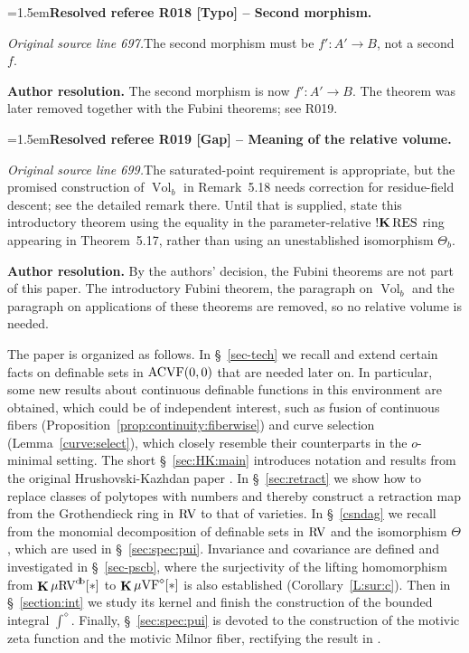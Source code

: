 \documentclass[12pt]{amsart}
\newcommand{\ResolvedRefereeRemark}[5]{%
  \par\medskip\begingroup\normalfont\small\color{gray}%
  \emergencystretch=1.5em\noindent\textbf{Resolved referee R#1 [#2] -- #3.}\par\nobreak\noindent #4\par
  \medskip\color{ResolutionGreen}\noindent\textbf{Author resolution.} #5\par
  \endgroup\medskip
}
\theoremstyle{plain}
\theoremstyle{definition}
\theoremstyle{remark}
\numberwithin{equation}{section}
\theoremstyle{plain}
\newcommand{\VF}{\textup{VF}}
\newcommand{\ACVF}{\textup{ACVF}}
\newcommand{\RV}{\textup{RV}}
\newcommand{\omin}{$o$\nobreakdash}
\newcommand{\0}{\emptyset}
\newcommand{\fun}{\longrightarrow}
\newcommand{\mgVF}{{\mu} {\VF}}
\newcommand{\mgRV}{{\mu}{\RV}}
\newcommand{\RES}{\textup{RES}}
\DeclareMathOperator{\ggk}{\mathbf{K}}
\DeclareMathOperator{\sggk}{!\mathbf{K}}
\DeclareMathOperator{\db}{d \! b}
\DeclareMathOperator{\Vol}{Vol}
\begin{document}
\ResolvedRefereeRemark{018}{Typo}{Second morphism}{%
\textit{Original source line 697.}\quad The second morphism must be $f':A'\longrightarrow B$, not a second $f$.
}{The second morphism is now $f' : A' \fun B$. The theorem was later removed together with the Fubini theorems; see R019.}



\ResolvedRefereeRemark{019}{Gap}{Meaning of the relative volume}{%
\textit{Original source line 699.}\quad The saturated-point requirement is appropriate, but the promised construction of $\Vol_b$ in Remark~5.18 needs correction for residue-field descent; see the detailed remark there. Until that is supplied, state this introductory theorem using the equality in the parameter-relative $\sggk\RES$ ring appearing in Theorem~5.17, rather than using an unestablished isomorphism $\Theta_b$.
}{By the authors' decision, the Fubini theorems are not part of this paper. The introductory Fubini theorem, the paragraph on $\Vol_b$ and the paragraph on applications of these theorems are removed, so no relative volume is needed.}





The paper is organized as follows. In \S~\ref{sec-tech} we recall and extend certain facts on definable sets in $\ACVF(0,0)$ that are needed later on. In particular,  some new results about continuous definable functions in this environment are obtained, which could be of independent interest, such as fusion of continuous fibers (Proposition~\ref{prop:continuity:fiberwise}) and curve selection (Lemma~\ref{curve:select}), which closely resemble their counterparts in the \omin-minimal setting. The short \S~\ref{sec:HK:main} introduces notation and results from the original Hrushovski-Kazhdan paper \cite{hrushovski:kazhdan:integration:vf}. In \S~\ref{sec:retract} we show how to replace classes of polytopes with numbers  and thereby construct a retraction map from the Grothendieck ring in $\RV$ to that of varieties. In \S~\ref{csndag} we recall from \cite{FY:Fubini} the monomial decomposition of definable sets in $\RV$ and the isomorphism $\Theta$, which are used in \S~\ref{sec:spec:pui}. Invariance and covariance are defined and investigated  in \S~\ref{sec-pscb}, where the surjectivity of the lifting homomorphism from $\ggk \mgRV^{\db}[*]$ to $\ggk \mgVF^\diamond[*]$ is also established (Corollary~\ref{L:sur:c}). Then in \S~\ref{section:int} we study its kernel and finish the construction of the bounded integral $\int^\diamond$. Finally, \S~\ref{sec:spec:pui} is devoted to the construction of the motivic zeta function and the motivic Milnor fiber, rectifying the result in \cite{hru:loe:lef}.
\end{document}
